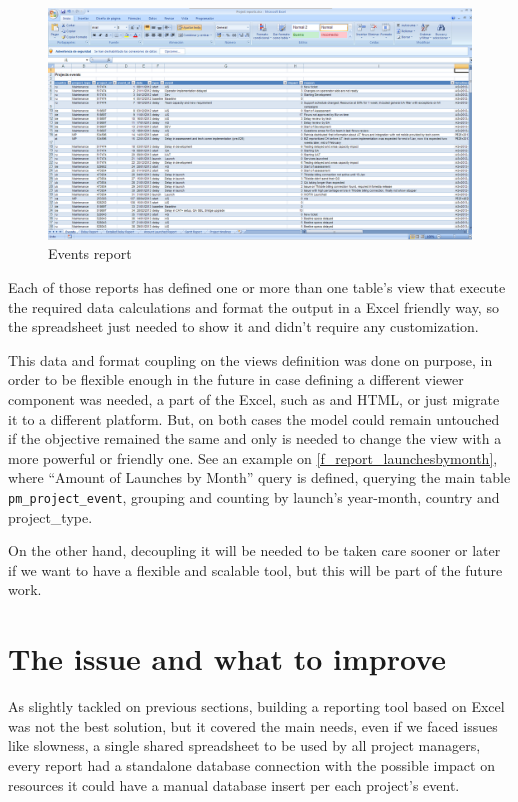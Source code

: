 \begin{figure}[ht!]
	\centering
   	\includegraphics[width=1\textwidth]{./resources/report_events.png}
   	\caption{Events report}
   	\label{f_report_events}
\end{figure}

Each of those reports has defined one or more than one table's view that execute
the required data calculations and format the output in a Excel friendly way, so
the spreadsheet just needed to show it and didn't require any customization. 

This data and format coupling on the views definition was done on purpose,
in order to be flexible enough in the future in case defining a different viewer
component was needed, a part of the Excel, such as and HTML, or just migrate it
to a different platform. But, on both cases the model could remain untouched if
the objective remained the same and only is needed to change the  view with a
more powerful or friendly one. See an example on
\ref{f_report_launchesbymonth}, where ``Amount of Launches by Month'' query 
is defined, querying the main table \texttt{pm\_project\_event}, grouping and
counting by launch's year-month, country and project\_type.



On the other hand, decoupling it will be needed to be taken care sooner or
later if we want to have a flexible and scalable tool, but this will be part of the
future work.

\section{The issue and what to improve}
As slightly tackled on previous sections, building a reporting tool based on
Excel was not the best solution, but it covered the main needs, even if we
faced issues like slowness, a single shared spreadsheet to be used by all
project managers, every report had a standalone database connection with the
possible impact on resources it could have a manual database insert per
each project's event.

